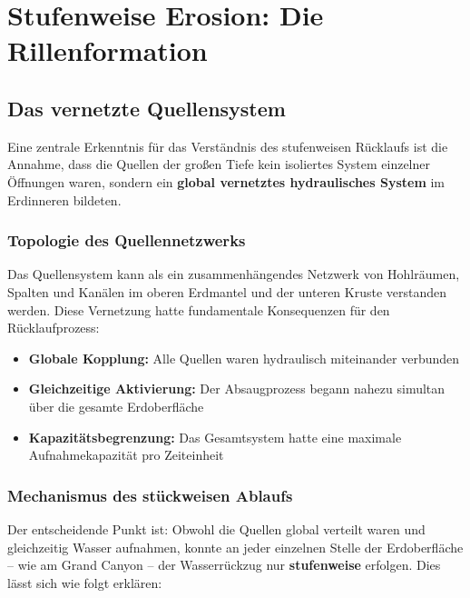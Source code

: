 ﻿\documentclass[12pt,a4paper]{report}
\begin{document}
\chapter{Stufenweise Erosion: Die Rillenformation}

\section{Das vernetzte Quellensystem}

Eine zentrale Erkenntnis für das Verständnis des stufenweisen Rücklaufs ist die Annahme, dass die Quellen der großen Tiefe kein isoliertes System einzelner Öffnungen waren, sondern ein \textbf{global vernetztes hydraulisches System} im Erdinneren bildeten.

\subsection{Topologie des Quellennetzwerks}

Das Quellensystem kann als ein zusammenhängendes Netzwerk von Hohlräumen, Spalten und Kanälen im oberen Erdmantel und der unteren Kruste verstanden werden. Diese Vernetzung hatte fundamentale Konsequenzen für den Rücklaufprozess:

\begin{itemize}
	\item \textbf{Globale Kopplung:} Alle Quellen waren hydraulisch miteinander verbunden
	\item \textbf{Gleichzeitige Aktivierung:} Der Absaugprozess begann nahezu simultan über die gesamte Erdoberfläche
	\item \textbf{Kapazitätsbegrenzung:} Das Gesamtsystem hatte eine maximale Aufnahmekapazität pro Zeiteinheit
\end{itemize}

\subsection{Mechanismus des stückweisen Ablaufs}

Der entscheidende Punkt ist: Obwohl die Quellen global verteilt waren und gleichzeitig Wasser aufnahmen, konnte an jeder einzelnen Stelle der Erdoberfläche -- wie am Grand Canyon -- der Wasserrückzug nur \textbf{stufenweise} erfolgen. Dies lässt sich wie folgt erklären:
\end{document}
